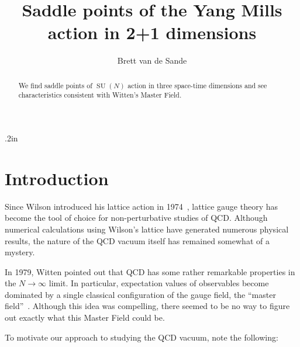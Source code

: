 \documentclass[preprint,aps,prd]{revtex4-2}
\DeclareMathOperator{\SU}{SU}
\begin{document}
\title{Saddle points of the Yang Mills action in 2+1 dimensions}


\author{Brett van de Sande}
\noaffiliation

\begin{abstract}
  We find saddle points of $\SU(N)$ action in three space-time dimensions
  and see characteristics consistent with Witten's Master Field.
\end{abstract}

\maketitle

\baselineskip .2in

\section{Introduction}
\label{intro}

Since Wilson introduced his lattice action in 1974~\cite{wilson_confinement_1974},
lattice gauge theory has become the tool of choice for
non-perturbative studies of QCD.  Although numerical
calculations using Wilson's lattice have generated numerous
physical results, the nature of the QCD vacuum itself
has remained somewhat of a mystery.


In 1979, Witten pointed out that QCD has some rather remarkable
properties in the $N \to \infty$ limit.  In particular,
expectation values of observables become dominated by a single
classical configuration of the gauge field, the
``master field''~\cite{witten_1/n_1980}.
Although this idea was compelling, there seemed to be no
way to figure out exactly what this Master Field could be.

To motivate our approach to studying the QCD vacuum, note the following:
\end{document}
